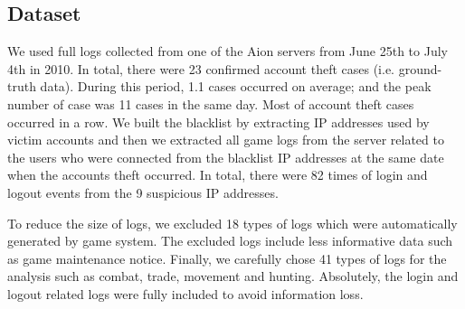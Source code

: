\documentclass[conference]{IEEEtran}
\begin{document}
\subsection{Dataset}
We used full logs collected from one of the Aion servers from June 25th to July 4th in 2010. In total, there were 23 confirmed account theft cases (i.e. ground-truth data). During this period, 1.1 cases occurred on average; and the peak number of case was 11 cases in the same day. Most of account theft cases occurred in a row. %
We built the blacklist by extracting IP addresses used by victim accounts and then we extracted all game logs from the server related to the users who were connected from the blacklist IP addresses at the same date when the accounts theft occurred. In total, there were 82 times of login and logout events from the 9 suspicious IP addresses. %

To reduce the size of logs, we excluded 18 types of logs which were automatically generated by game system. The excluded logs include less informative data such as game maintenance notice. Finally, we carefully chose 41 types of logs for the analysis such as combat, trade, movement and hunting. Absolutely, the login and logout related logs were fully included to avoid information loss. 
\end{document}
